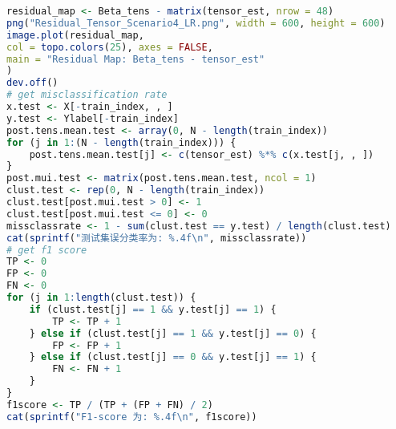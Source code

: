 \documentclass[AutoFakeBold]{LZUThesis}
\begin{document}
\begin{lstlisting}[language = R, caption = {BT-LR}算法]
residual_map <- Beta_tens - matrix(tensor_est, nrow = 48)
png("Residual_Tensor_Scenario4_LR.png", width = 600, height = 600)
image.plot(residual_map,
col = topo.colors(25), axes = FALSE,
main = "Residual Map: Beta_tens - tensor_est"
)
dev.off()
# get misclassification rate
x.test <- X[-train_index, , ]
y.test <- Ylabel[-train_index]
post.tens.mean.test <- array(0, N - length(train_index))
for (j in 1:(N - length(train_index))) {
	post.tens.mean.test[j] <- c(tensor_est) %*% c(x.test[j, , ])
}
post.mui.test <- matrix(post.tens.mean.test, ncol = 1)
clust.test <- rep(0, N - length(train_index))
clust.test[post.mui.test > 0] <- 1
clust.test[post.mui.test <= 0] <- 0
missclassrate <- 1 - sum(clust.test == y.test) / length(clust.test)
cat(sprintf("测试集误分类率为: %.4f\n", missclassrate))
# get f1 score
TP <- 0
FP <- 0
FN <- 0
for (j in 1:length(clust.test)) {
	if (clust.test[j] == 1 && y.test[j] == 1) {
		TP <- TP + 1
	} else if (clust.test[j] == 1 && y.test[j] == 0) {
		FP <- FP + 1
	} else if (clust.test[j] == 0 && y.test[j] == 1) {
		FN <- FN + 1
	}
}
f1score <- TP / (TP + (FP + FN) / 2)
cat(sprintf("F1-score 为: %.4f\n", f1score))

\end{lstlisting}
\end{document}
